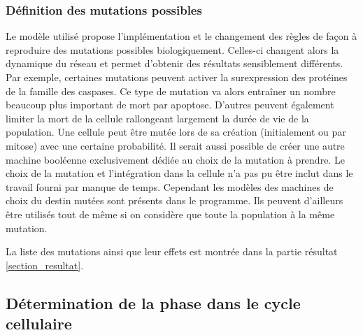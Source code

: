 \documentclass[11pt, a4paper]{article}
\begin{document}
\subsubsection{Définition des mutations possibles}
Le modèle utilisé propose l'implémentation et le changement des règles de façon
à reproduire des mutations possibles biologiquement. Celles-ci changent alors
la dynamique du réseau et permet d'obtenir des résultats sensiblement
différents.  Par exemple, certaines mutations peuvent activer la surexpression
des protéines de la famille des caspases. Ce type de mutation va alors
entraîner un nombre beaucoup plus important de mort par apoptose. D'autres
peuvent également limiter la mort de la cellule rallongeant largement la durée
de vie de la population.  Une cellule peut être mutée lors de sa création
(initialement ou par mitose) avec une certaine probabilité. Il serait aussi
possible de créer une autre machine booléenne exclusivement dédiée au choix de
la mutation à prendre. Le choix de la mutation et l'intégration dans la cellule
n'a pas pu être inclut dans le travail fourni par manque de temps. Cependant
les modèles des machines de choix du destin mutées sont présents dans le
programme. Ils peuvent d'ailleurs être utilisés tout de même si on considère
que toute la population à la même mutation.

La liste des mutations ainsi que leur effets est montrée dans la partie
résultat \ref{section_resultat}.

\subsection{Détermination de la phase dans le cycle cellulaire}
\end{document}
